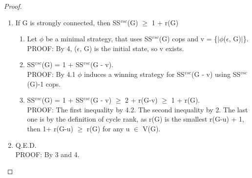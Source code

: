 \begin{proof}
\begin{enumerate}
\begin{enumerate}[label*=\arabic*.]
    \item SS$^{vsc}$(G) $\geq$ $\max_{H_i}$ SS$^{vsc}$($H_i$) $\geq$  $\max_{H_i}$ (1 + r($H_i$)) = 1 + r(G). \\
    PROOF: The first equality by 3.2. The second inequality by 3.3. The last one by definition of cycle rank.
  \end{enumerate}
  \item If G is strongly connected, then SS$^{vsc}$(G) $\geq$ 1 + r(G) 
  \begin{enumerate}[label*=\arabic*.]
    \item Let $\phi$ be a minimal strategy, that uses SS$^{vsc}$(G) cops and v = \{$|\phi$($\epsilon$, G)$|$\}. \\
    PROOF: By 4, ($\epsilon$, G) is the initial state, so v exists.
    
    \item SS$^{vsc}$(G) = 1 + SS$^{vsc}$(G - v). \\
    PROOF: By 4.1 $\phi$ induces a winning strategy for SS$^{vsc}$(G - v) using SS$^{vsc}$(G)-1 cops.
    
    \item SS$^{vsc}$(G) = 1 + SS$^{vsc}$(G - v) $\geq$ 2 + r(G-v) $\geq$ 1 + r(G). \\
    PROOF: The first inequality by 4.2. The second inequality by 2. The last one is by the definition of cycle rank, as r(G) is the smallest r(G-u) + 1, then 1+ r(G-u) $\geq$ r(G) for any u $\in$ V(G).
  \end{enumerate}
  \item Q.E.D. \\
  PROOF: By 3 and 4.
\end{enumerate}
\end{proof}

